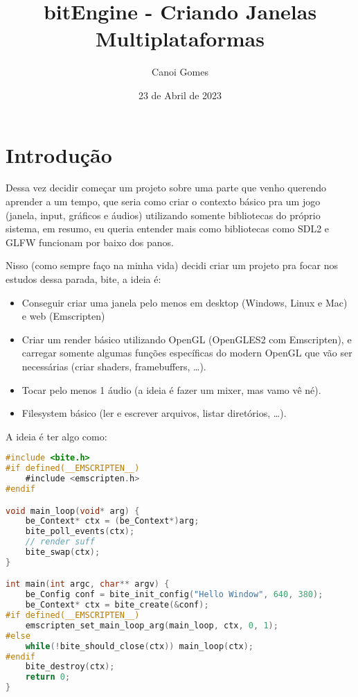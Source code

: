 \documentclass[a4paper,oneside,12pt]{article}
\title{bitEngine - Criando Janelas Multiplataformas}
\author{Canoi Gomes}
\date{23 de Abril de 2023}
\begin{document}
\maketitle
\newpage

\tableofcontents
\newpage

\section{Introdução}

Dessa vez decidir começar um projeto sobre uma parte que venho querendo aprender a um tempo, que seria como criar o contexto básico pra um jogo (janela, input, gráficos e áudios) utilizando somente bibliotecas do próprio sistema, em resumo, eu queria entender mais como bibliotecas como SDL2 e GLFW funcionam por baixo dos panos.

Nisso (como sempre faço na minha vida) decidi criar um projeto pra focar nos estudos dessa parada, bite, a ideia é:

\begin{itemize}
    \item Conseguir criar uma janela pelo menos em desktop (Windows, Linux e Mac) e web (Emscripten)
    \item Criar um render básico utilizando OpenGL (OpenGLES2 com Emscripten), e carregar somente algumas funções específicas do modern OpenGL que vão ser necessárias (criar shaders, framebuffers, …).
    \item Tocar pelo menos 1 áudio (a ideia é fazer um mixer, mas vamo vê né).
    \item Filesystem básico (ler e escrever arquivos, listar diretórios, …).
\end{itemize}

\noindent
A ideia é ter algo como:
\begin{lstlisting}[language=C]
#include <bite.h>
#if defined(__EMSCRIPTEN__)
    #include <emscripten.h>
#endif

void main_loop(void* arg) {
    be_Context* ctx = (be_Context*)arg;
    bite_poll_events(ctx);
    // render suff
    bite_swap(ctx);
}

int main(int argc, char** argv) {
    be_Config conf = bite_init_config("Hello Window", 640, 380);
    be_Context* ctx = bite_create(&conf);
#if defined(__EMSCRIPTEN__)
    emscripten_set_main_loop_arg(main_loop, ctx, 0, 1);
#else
    while(!bite_should_close(ctx)) main_loop(ctx);
#endif
    bite_destroy(ctx);
    return 0;
}
\end{lstlisting}
\end{document}
